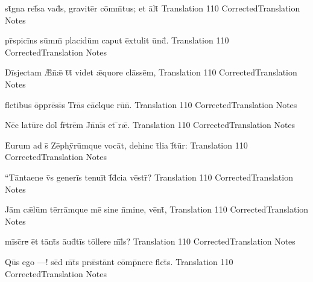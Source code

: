 \latline
  {st\={}gn\-a r\-ef\={}s\-a v\-ad\={\macron {\i}}s, gr\-av\-it\=er c\=omm\={}t\-us; \-et \=alt\={}}
  { Translation }
  {110}
  { CorrectedTranslation }
  { Notes }





\latline
  {pr\={}sp\-ic\-i\={}ns s\=umm\={} pl\-ac\-id\=um c\-ap\-ut \=ext\-ul\-it \=und\={}.}
  { Translation }
  {110}
  { CorrectedTranslation }
  { Notes }


\latline
  {D\=isj\-ect\-am \={\AE}n\={}\={\ae} t\={}t\={} v\-id\-et \={\ae}qu\-or\-e cl\=ass\=em,}
  { Translation }
  {110}
  { CorrectedTranslation }
  { Notes }


\latline
  {fl\={}ct\-ib\-us \=oppr\=ess\={}s Tr\={}\=as c\={\=ae}l\={\macron {\i}}qu\-e r\-u\={\macron {\i}}n\={}.}
  { Translation }
  {110}
  { CorrectedTranslation }
  { Notes }





\latline
  {N\=ec l\-at\-u\={}r\-e d\-ol\={\macron {\i}} fr\={}tr\=em J\={}n\={}n\=is \-et \={\macron {\i}}r\={\ae}.}
  { Translation }
  {110}
  { CorrectedTranslation }
  { Notes }


\latline
  {\={Eu}r\-um \-ad s\={} Z\=eph\=yr\=umqu\-e v\-oc\=at, d\-eh\-inc t\={}l\-i\-a f\={}t\=ur:}
  { Translation }
  {110}
  { CorrectedTranslation }
  { Notes }


\latline
  {``T\=ant\-aen\-e v\={}s g\-en\-er\=is t\-en\-u\=it f\={\macron {\i}}d\={}c\-i\-a v\=estr\={\macron {\i}}?}
  { Translation }
  {110}
  { CorrectedTranslation }
  { Notes }





\latline
  {J\=am c\={\ae}l\=um t\=err\=amqu\-e m\-e\={} s\-in\-e n\={}m\-in\-e, v\=ent\={\macron {\i}},}
  { Translation }
  {110}
  { CorrectedTranslation }
  { Notes }


\latline
  {m\=isc\={}r\sout{e }\=et t\=ant\={}s \={au}d\={}t\=is t\=oll\-er\-e m\={}l\={}s?}
  { Translation }
  {110}
  { CorrectedTranslation }
  { Notes }


\latline
  {Qu\={}s \-eg\-o ---! s\=ed m\={}t\={}s pr\={\ae}st\=ant c\=omp\={}n\-er\-e fl\={}ct\={}s.}
  { Translation }
  {110}
  { CorrectedTranslation }
  { Notes }





